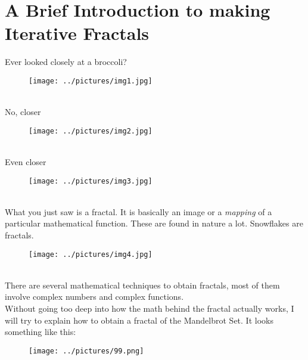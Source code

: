 \documentclass{article}
\begin{document}
\section*{A Brief Introduction to making Iterative Fractals}
Ever looked closely at a broccoli?
\begin{figure}[h]
\begin{center}
\texttt{[image: ../pictures/img1.jpg]}
\end{center}
\end{figure}
\newline \\ No, closer
\begin{figure}[h]
\begin{center}
\texttt{[image: ../pictures/img2.jpg]}
\end{center}
\end{figure}
\newline \\ Even closer
\begin{figure}[h]
\begin{center}
\texttt{[image: ../pictures/img3.jpg]}
\end{center}
\end{figure}
\newline \\ What you just saw is a fractal. It is basically an image or a \emph{mapping} of a particular mathematical function. These are found in nature a lot. Snowflakes are fractals.
\begin{figure}[h]
\begin{center}
\texttt{[image: ../pictures/img4.jpg]}
\end{center}
\end{figure}
\newline \\ There are several mathematical techniques to obtain fractals, most of them involve complex numbers and complex functions.
\newline \\ Without going too deep into how the math behind the fractal actually works, I will try to explain how to obtain a fractal of the Mandelbrot Set. It looks something like this:
\begin{figure}[h]
\begin{center}
\texttt{[image: ../pictures/99.png]}
\end{center}
\end{figure}
\newline
\end{document}
